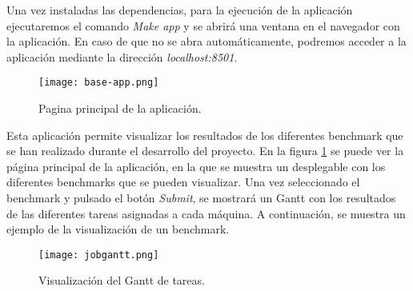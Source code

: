 Una vez instaladas las dependencias, para la ejecución de la aplicación
ejecutaremos el comando \textit{Make app} y se abrirá una ventana en el
navegador con la aplicación. En caso de que no se abra automáticamente,
podremos acceder a la aplicación mediante la dirección \textit{localhost:8501}.

\begin{figure}[ht]
    \centering
    \texttt{[image: base-app.png]}
    \caption{Pagina principal de la aplicación.}
    \label{fig:demo}
\end{figure}

Esta aplicación permite visualizar los resultados de los diferentes
benchmark que se han realizado durante el desarrollo del proyecto. En la
figura \ref{fig:demo} se puede ver la página principal de la aplicación,
en la que se muestra un desplegable con los diferentes benchmarks que se
pueden visualizar. Una vez seleccionado el benchmark y pulsado el botón
\textit{Submit}, se mostrará un Gantt con los resultados de las diferentes
tareas asignadas a cada máquina. A continuación, se muestra un ejemplo de
la visualización de un benchmark.

\begin{figure}[ht]
    \centering
    \texttt{[image: jobgantt.png]}
    \caption{Visualización del Gantt de tareas.}
    \label{fig:demo-2}
\end{figure}

\pagebreak

